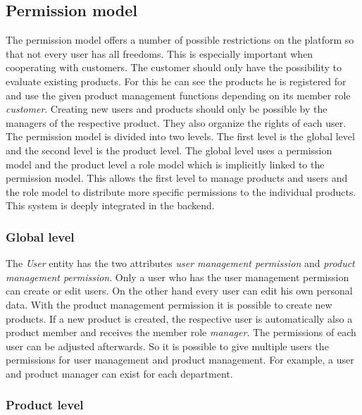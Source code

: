 \subsection{Permission model}

\label{subsec:permissionModel}
The permission model offers a number of possible restrictions on the platform so that not every user has all freedoms. This is especially important when cooperating with customers. The customer should only have the possibility to evaluate existing products. For this he can see the products he is registered for and use the given product management functions depending on its member role \textit{customer}. Creating new users and products should only be possible by the managers of the respective product. They also organize the rights of each user. The permission model is divided into two levels. The first level is the global level and the second level is the product level. The global level uses a permission model and the product level a role model which is implicitly linked to the permission model. 
This allows the first level to manage products and users and the role model to distribute more specific permissions to the individual products. This system is deeply integrated in the backend.

\subsubsection*{Global level}

The \textit{User} entity has the two attributes \textit{user management permission} and \textit{product management permission}. Only a user who has the user management permission can create or edit users. On the other hand every user can edit his own personal data. With the product management permission it is possible to create new products. If a new product is created, the respective user is automatically also a product member and receives the member role \textit{manager}. The permissions of each user can be adjusted afterwards. So it is possible to give multiple users the permissions for user management and product management. For example, a user and product manager can exist for each department. 

\subsubsection*{Product level}

